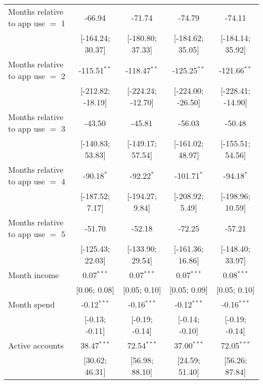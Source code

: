\begin{table}[htbp]
\begin{threeparttable}[b]
\begin{tabular}{lcccc}
         Months relative to app use $=$ 1  & -66.94            & -71.74            & -74.79            & -74.11\\   
                                           & [-164.24; 30.37]  & [-180.80; 37.33]  & [-184.62; 35.05]  & [-184.14; 35.92]\\   
         Months relative to app use $=$ 2  & -115.51$^{**}$    & -118.47$^{**}$    & -125.25$^{**}$    & -121.66$^{**}$\\   
                                           & [-212.82; -18.19] & [-224.24; -12.70] & [-224.00; -26.50] & [-228.41; -14.90]\\   
         Months relative to app use $=$ 3  & -43.50            & -45.81            & -56.03            & -50.48\\   
                                           & [-140.83; 53.83]  & [-149.17; 57.54]  & [-161.02; 48.97]  & [-155.51; 54.56]\\   
         Months relative to app use $=$ 4  & -90.18$^{*}$      & -92.22$^{*}$      & -101.71$^{*}$     & -94.18$^{*}$\\   
                                           & [-187.52; 7.17]   & [-194.27; 9.84]   & [-208.92; 5.49]   & [-198.96; 10.59]\\   
         Months relative to app use $=$ 5  & -51.70            & -52.18            & -72.25            & -57.21\\   
                                           & [-125.43; 22.03]  & [-133.90; 29.54]  & [-161.36; 16.86]  & [-148.40; 33.97]\\   
         Month income                      & 0.07$^{***}$      & 0.07$^{***}$      & 0.07$^{***}$      & 0.08$^{***}$\\   
                                           & [0.06; 0.08]      & [0.05; 0.10]      & [0.05; 0.09]      & [0.05; 0.10]\\   
         Month spend                       & -0.12$^{***}$     & -0.16$^{***}$     & -0.12$^{***}$     & -0.16$^{***}$\\   
                                           & [-0.13; -0.11]    & [-0.19; -0.14]    & [-0.14; -0.10]    & [-0.19; -0.14]\\   
         Active accounts                   & 38.47$^{***}$     & 72.54$^{***}$     & 37.00$^{***}$     & 72.05$^{***}$\\   
                                           & [30.62; 46.31]    & [56.98; 88.10]    & [24.59; 51.40]    & [56.26; 87.84]\\   

\end{tabular}
\end{threeparttable}
\end{table}
